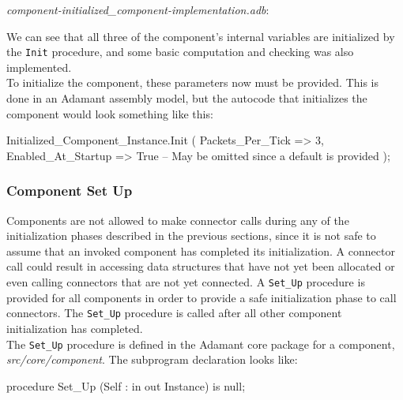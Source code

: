\textit{component-initialized\_component-implementation.adb}:

We can see that all three of the component's internal variables are initialized by the \texttt{Init} procedure, and some basic computation and checking was also implemented. \\

To initialize the component, these parameters now must be provided. This is done in an Adamant assembly model, but the autocode that initializes the component would look something like this:

\vspace{5mm} %
\begin{adacode}
  Initialized_Component_Instance.Init (
    Packets_Per_Tick => 3,
    Enabled_At_Startup => True -- May be omitted since a default is provided
  );
\end{adacode}
\vspace{5mm} %

\subsubsection{Component Set Up} \label{Component Set Up}

Components are not allowed to make connector calls during any of the initialization phases described in the previous sections, since it is not safe to assume that an invoked component has completed its initialization. A connector call could result in accessing data structures that have not yet been allocated or even calling connectors that are not yet connected. A \texttt{Set\_Up} procedure is provided for all components in order to provide a safe initialization phase to call connectors. The \texttt{Set\_Up} procedure is called after all other component initialization has completed. \\

The \texttt{Set\_Up} procedure is defined in the Adamant core package for a component, \textit{src/core/component}. The subprogram declaration looks like:

\vspace{5mm} %
\begin{adacode}
procedure Set_Up (Self : in out Instance) is null;
\end{adacode}
\vspace{5mm} %

